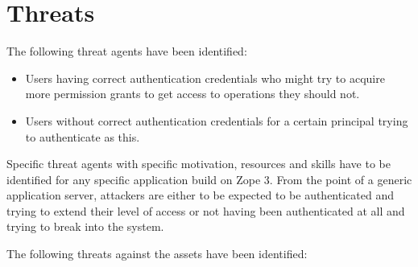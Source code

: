 \documentclass[12pt,english]{scrbook}
\begin{document}



\section{Threats}

The following threat agents have been identified:

\begin{itemize} 
  
  \item Users having correct authentication credentials who might try to
  acquire more permission grants to get access to operations they should not.

  \item Users without correct authentication credentials for a certain
  principal trying to authenticate as this.

\end{itemize}

Specific threat agents with specific motivation, resources and skills have to
be identified for any specific application build on Zope 3. From the point of a
generic application server, attackers are either to be expected to  be
authenticated and trying to extend their level of access or not having been
authenticated at all and trying to break into the system.

The following threats against the assets have been identified:
\end{document}

